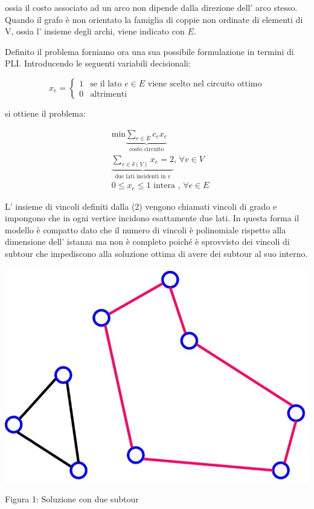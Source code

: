 \documentclass[11pt]{article}
\begin{document}
ossia il costo associato ad un arco non dipende dalla direzione dell' arco stesso. Quando il grafo \`e non orientato la famiglia di coppie non ordinate di elementi di V, ossia l' insieme degli archi, viene indicato con $E$.


Definito il problema forniamo ora una sua possibile formulazione in termini di PLI. Introducendo le seguenti variabili decisionali:

\[
x_{e}=
\begin{cases}
1 & \text{se il lato $e \in E$ viene scelto nel circuito ottimo} \\
0 & \text{altrimenti}
\end{cases}
\]

si ottiene il problema:

\begin{eqnarray}
& \text{min}\displaystyle\underbrace{\sum_{e \in E} c_e x_e}_{\text{costo circuito}} \\[1.5ex]
&\displaystyle\underbrace{\sum_{e \in \delta(V)} x_e = 2}_{\text{due lati incidenti in }v}\text{,  }\forall v \in V \\[1.5ex]
&0\leq x_e \leq 1 \text{ intera , }\forall e \in E
\end{eqnarray}

L' insieme di vincoli definiti dalla (2) vengono chiamati vincoli di grado e impongono che in ogni vertice incidono esattamente due lati. In questa forma il modello \`e  compatto dato che il numero di vincoli \`e polinomiale rispetto alla dimensione dell' istanza ma non \`e completo poich\'e \`e sprovvisto dei vincoli di subtour che impediscono alla soluzione ottima di avere dei subtour al suo interno.

\begin{center}
\includegraphics[scale=0.5]{subtour}  

Figura 1: Soluzione con due subtour
\end{center}
\end{document}
